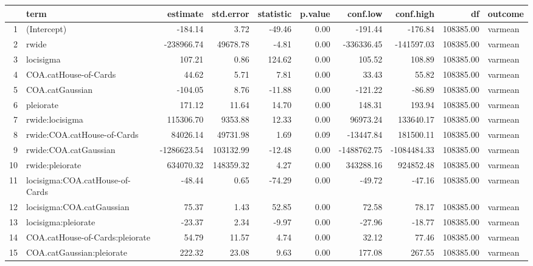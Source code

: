 \begin{table}[ht]
\centering
\begin{tabular}{rlrrrrrrrl}
  \hline
 & term & estimate & std.error & statistic & p.value & conf.low & conf.high & df & outcome \\ 
  \hline
1 & (Intercept) & -184.14 & 3.72 & -49.46 & 0.00 & -191.44 & -176.84 & 108385.00 & varmean \\ 
  2 & rwide & -238966.74 & 49678.78 & -4.81 & 0.00 & -336336.45 & -141597.03 & 108385.00 & varmean \\ 
  3 & locisigma & 107.21 & 0.86 & 124.62 & 0.00 & 105.52 & 108.89 & 108385.00 & varmean \\ 
  4 & COA.catHouse-of-Cards & 44.62 & 5.71 & 7.81 & 0.00 & 33.43 & 55.82 & 108385.00 & varmean \\ 
  5 & COA.catGaussian & -104.05 & 8.76 & -11.88 & 0.00 & -121.22 & -86.89 & 108385.00 & varmean \\ 
  6 & pleiorate & 171.12 & 11.64 & 14.70 & 0.00 & 148.31 & 193.94 & 108385.00 & varmean \\ 
  7 & rwide:locisigma & 115306.70 & 9353.88 & 12.33 & 0.00 & 96973.24 & 133640.17 & 108385.00 & varmean \\ 
  8 & rwide:COA.catHouse-of-Cards & 84026.14 & 49731.98 & 1.69 & 0.09 & -13447.84 & 181500.11 & 108385.00 & varmean \\ 
  9 & rwide:COA.catGaussian & -1286623.54 & 103132.99 & -12.48 & 0.00 & -1488762.75 & -1084484.33 & 108385.00 & varmean \\ 
  10 & rwide:pleiorate & 634070.32 & 148359.32 & 4.27 & 0.00 & 343288.16 & 924852.48 & 108385.00 & varmean \\ 
  11 & locisigma:COA.catHouse-of-Cards & -48.44 & 0.65 & -74.29 & 0.00 & -49.72 & -47.16 & 108385.00 & varmean \\ 
  12 & locisigma:COA.catGaussian & 75.37 & 1.43 & 52.85 & 0.00 & 72.58 & 78.17 & 108385.00 & varmean \\ 
  13 & locisigma:pleiorate & -23.37 & 2.34 & -9.97 & 0.00 & -27.96 & -18.77 & 108385.00 & varmean \\ 
  14 & COA.catHouse-of-Cards:pleiorate & 54.79 & 11.57 & 4.74 & 0.00 & 32.12 & 77.46 & 108385.00 & varmean \\ 
  15 & COA.catGaussian:pleiorate & 222.32 & 23.08 & 9.63 & 0.00 & 177.08 & 267.55 & 108385.00 & varmean \\ 
   \hline
\end{tabular}
\end{table}
